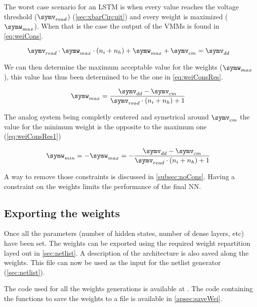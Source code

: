 The worst case scenario for an \ac{LSTM} is when every value reaches the voltage threshold ($\symv_{read}$) (\cref{sec:xbarCircuit}) and every weight is maximized ($\symw_{max}$). When that is the case the output of the \acp{VMM} is found in \cref{eq:weiCons}.

\begin{equation}\label{eq:weiCons}
  \symv_{read}\cdot \symw_{max} \cdot(n_i+n_h)+\symw_{max}+\symv_{cm}= \symv_{dd}
\end{equation}

We can then determine the maximum acceptable value for the weights ($\symw_{max}$), this value has thus been determined to be the one in \cref{eq:weiConsRes}.

\begin{equation}\label{eq:weiConsRes}
  \symw_{max}=\frac{\symv_{dd}-\symv_{cm}}{\symv_{read}\cdot(n_i+n_h)+1}
\end{equation}

The analog system being completly centered and symetrical around $\symv_{cm}$ the value for the minimum weight is the opposite to the maximum one (\cref{eq:weiConsRes1})

\begin{equation}\label{eq:weiConsRes1}
  \symw_{min}=-\symw_{max}=-\frac{\symv_{dd}-\symv_{cm}}{\symv_{read}\cdot(n_i+n_h)+1}
\end{equation}

A way to remove those constraints is discussed in \cref{subsec:noCons}. Having a constraint on the weights limits the performance of the final \ac{NN}.

\subsection{Exporting the weights}

Once all the parameters (number of hidden states, number of dense layers, etc) have been set. The weights can be exported using the required weight repartition layed out in \cref{sec:netlist}. A description of the architecture is also saved along the weights. This file can now be used as the input for the netlist generator (\cref{sec:netlist}).

The code used for all the weights generations is available at \cite{lstmWei}. The code containing the functions to save the weights to a file is available in \cref{apsec:saveWei}.
